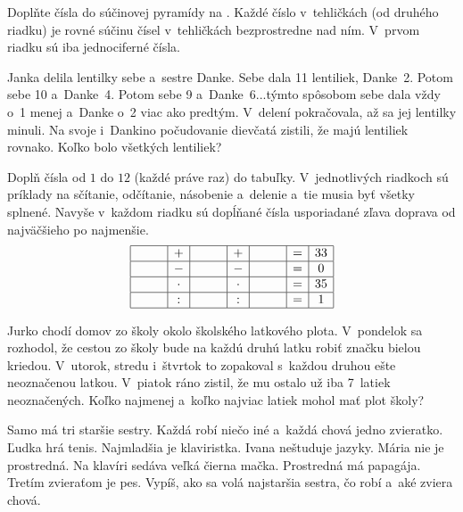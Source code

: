 ﻿{%
Doplňte čísla do súčinovej pyramídy na \obr. Každé číslo v~tehličkách (od druhého riadku) je rovné súčinu čísel v~tehličkách bezprostredne nad ním. V~prvom riadku sú iba jednociferné čísla.
%
}

{%
Janka delila lentilky sebe a~sestre Danke. Sebe dala 11 lentiliek, Danke~2. Potom sebe 10 a~Danke~4. Potom sebe 9 a~Danke~6...týmto spôsobom sebe dala vždy o~1 menej a~Danke o~2 viac ako predtým. V~delení pokračovala, až sa jej lentilky minuli. Na svoje i~Dankino počudovanie dievčatá zistili, že majú lentiliek rovnako. Koľko bolo všetkých lentiliek?}

{%
Doplň čísla od $1$ do $12$ (každé práve raz) do tabuľky. V~jednotlivých riadkoch sú príklady na sčítanie, odčítanie, násobenie a~delenie a~tie musia byť všetky splnené. Navyše v~každom riadku sú dopĺňané čísla usporiadané zľava doprava od najväčšieho po najmenšie.
$$
\begin{array}{|c|c|c|c|c|c|c|}
\hline
\hspace{2em} & + & \hspace{2em} & + & \hspace{2em} & = & 33 \\
\hline
\hspace{2em} & - & \hspace{2em} & - & \hspace{2em} & = & 0 \\
\hline
\hspace{2em} & \cdot & \hspace{2em} & \cdot & \hspace{2em} & = & 35 \\
\hline
\hspace{2em} & : & \hspace{2em} & : & \hspace{2em} & = & 1 \\
\hline
\end{array}
$$
}

{%
Jurko chodí domov zo školy okolo školského latkového plota. V~pondelok sa rozhodol, že cestou zo školy bude na každú druhú latku robiť značku bielou kriedou. V~utorok, stredu i~štvrtok to zopakoval s~každou druhou ešte neoznačenou latkou. V~piatok ráno zistil, že mu ostalo už iba 7~latiek neoznačených. Koľko najmenej a~koľko najviac latiek mohol mať plot školy?}

{%
Samo má tri staršie sestry. Každá robí niečo iné a~každá chová jedno zvieratko. Ľudka hrá tenis. Najmladšia je klaviristka. Ivana neštuduje jazyky. Mária nie je prostredná. Na klavíri sedáva veľká čierna mačka. Prostredná má papagája. Tretím zvieraťom je pes.
Vypíš, ako sa volá najstaršia sestra, čo robí a~aké zviera chová.}

